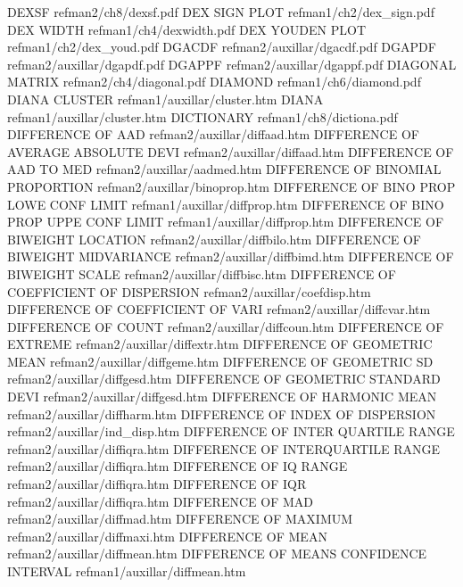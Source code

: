 DEXSF                                   refman2/ch8/dexsf.pdf
DEX SIGN PLOT                           refman1/ch2/dex_sign.pdf
DEX WIDTH                               refman1/ch4/dexwidth.pdf
DEX YOUDEN PLOT                         refman1/ch2/dex_youd.pdf
DGACDF                                  refman2/auxillar/dgacdf.pdf
DGAPDF                                  refman2/auxillar/dgapdf.pdf
DGAPPF                                  refman2/auxillar/dgappf.pdf
DIAGONAL MATRIX                         refman2/ch4/diagonal.pdf
DIAMOND                                 refman1/ch6/diamond.pdf
DIANA CLUSTER                           refman1/auxillar/cluster.htm
DIANA                                   refman1/auxillar/cluster.htm
DICTIONARY                              refman1/ch8/dictiona.pdf
DIFFERENCE OF AAD                       refman2/auxillar/diffaad.htm
DIFFERENCE OF AVERAGE ABSOLUTE DEVI     refman2/auxillar/diffaad.htm
DIFFERENCE OF AAD TO MED                refman2/auxillar/aadmed.htm
DIFFERENCE OF BINOMIAL PROPORTION       refman2/auxillar/binoprop.htm
DIFFERENCE OF BINO PROP LOWE CONF LIMIT refman1/auxillar/diffprop.htm
DIFFERENCE OF BINO PROP UPPE CONF LIMIT refman1/auxillar/diffprop.htm
DIFFERENCE OF BIWEIGHT LOCATION         refman2/auxillar/diffbilo.htm
DIFFERENCE OF BIWEIGHT MIDVARIANCE      refman2/auxillar/diffbimd.htm
DIFFERENCE OF BIWEIGHT SCALE            refman2/auxillar/diffbisc.htm
DIFFERENCE OF COEFFICIENT OF DISPERSION refman2/auxillar/coefdisp.htm
DIFFERENCE OF COEFFICIENT OF VARI       refman2/auxillar/diffcvar.htm
DIFFERENCE OF COUNT                     refman2/auxillar/diffcoun.htm
DIFFERENCE OF EXTREME                   refman2/auxillar/diffextr.htm
DIFFERENCE OF GEOMETRIC MEAN            refman2/auxillar/diffgeme.htm
DIFFERENCE OF GEOMETRIC SD              refman2/auxillar/diffgesd.htm
DIFFERENCE OF GEOMETRIC STANDARD DEVI   refman2/auxillar/diffgesd.htm
DIFFERENCE OF HARMONIC MEAN             refman2/auxillar/diffharm.htm
DIFFERENCE OF INDEX OF DISPERSION       refman2/auxillar/ind_disp.htm
DIFFERENCE OF INTER QUARTILE RANGE      refman2/auxillar/diffiqra.htm
DIFFERENCE OF INTERQUARTILE RANGE       refman2/auxillar/diffiqra.htm
DIFFERENCE OF IQ RANGE                  refman2/auxillar/diffiqra.htm
DIFFERENCE OF IQR                       refman2/auxillar/diffiqra.htm
DIFFERENCE OF MAD                       refman2/auxillar/diffmad.htm
DIFFERENCE OF MAXIMUM                   refman2/auxillar/diffmaxi.htm
DIFFERENCE OF MEAN                      refman2/auxillar/diffmean.htm
DIFFERENCE OF MEANS CONFIDENCE INTERVAL refman1/auxillar/diffmean.htm
